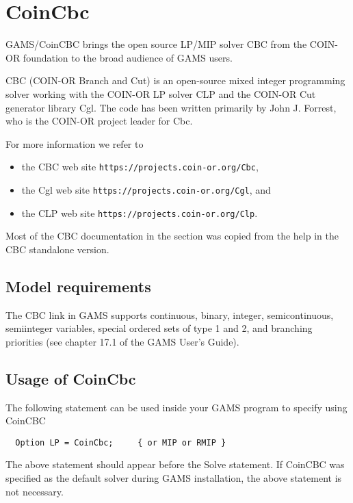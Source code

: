 \section{CoinCbc}
\label{sec:coincbc}
\hypertarget{sec:coincbc}{}

GAMS/CoinCBC brings the open source LP/MIP solver CBC from the COIN-OR foundation to the broad audience of GAMS users.

CBC (COIN-OR Branch and Cut) is an open-source mixed integer programming solver working with the COIN-OR LP solver CLP and the COIN-OR Cut generator library Cgl.
The code has been written primarily by John J. Forrest, who is the COIN-OR project leader for Cbc.

For more information we refer to
\begin{itemize}
\item the CBC web site \texttt{https://projects.coin-or.org/Cbc},
\item the Cgl web site \texttt{https://projects.coin-or.org/Cgl}, and
\item the CLP web site \texttt{https://projects.coin-or.org/Clp}.
\end{itemize}
Most of the CBC documentation in the section was copied from the help in the CBC standalone version.

\subsection{Model requirements}

The CBC link in GAMS supports continuous, binary, integer, semicontinuous, semiinteger variables, special ordered sets of type 1 and 2, and branching priorities (see chapter 17.1 of the GAMS User's Guide).

\subsection{Usage of CoinCbc}

The following statement can be used inside your GAMS program to specify using CoinCBC
\begin{verbatim}
  Option LP = CoinCbc;     { or MIP or RMIP }
\end{verbatim}

The above statement should appear before the Solve statement.
If CoinCBC was specified as the default solver during GAMS installation, the above statement is not necessary.

